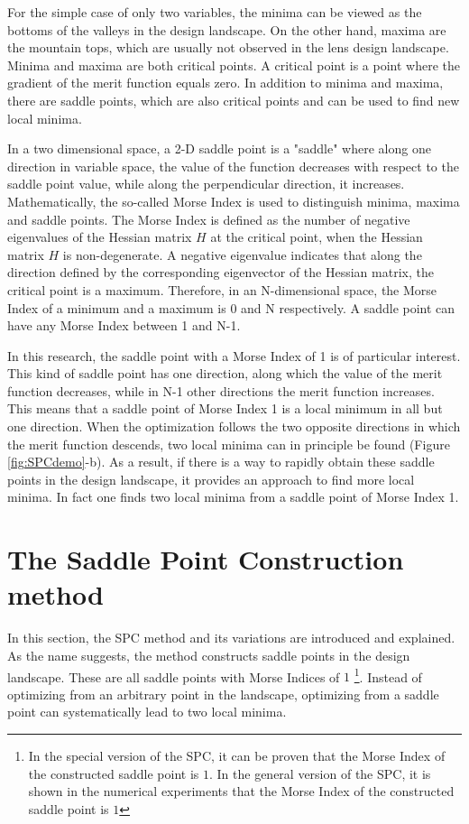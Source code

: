 For the simple case of only two variables, the minima can be viewed as the bottoms of the valleys in the design landscape. On the other hand, maxima are the mountain tops, which are usually not observed in the lens design landscape. Minima and maxima are both critical points. A critical point is a point where the gradient of the merit function equals zero. In addition to minima and maxima, there are saddle points, which are also critical points and can be used to find new local minima.

In a two dimensional space, a 2-D saddle point is a "saddle" where along one direction in variable space, the value of the function decreases with respect to the saddle point value, while along the perpendicular direction, it increases. Mathematically, the so-called Morse Index is used to distinguish minima, maxima and saddle points. The Morse Index is defined as the number of negative eigenvalues of the Hessian matrix \textbf{$H$} at the critical point, when the Hessian matrix \textbf{$H$} is non-degenerate. A negative eigenvalue indicates that along the direction defined by the corresponding eigenvector of the Hessian matrix, the critical point is a maximum. Therefore, in an N-dimensional space, the Morse Index of a minimum and a maximum is 0 and N respectively. A saddle point can have any Morse Index between 1 and N-1. 

In this research, the saddle point with a Morse Index of 1 is of particular interest. This kind of saddle point has one direction, along which the value of the merit function decreases, while in N-1 other directions the merit function increases. This means that a saddle point of Morse Index 1 is a local minimum in all but one direction. When the optimization follows the two opposite directions in which the merit function descends, two local minima can in principle be found (Figure \ref{fig:SPCdemo}-b). As a result, if there is a way to rapidly obtain these saddle points in the design landscape, it provides an approach to find more local minima. In fact one finds two local minima from a saddle point of Morse Index 1. 

\section{The Saddle Point Construction method}
In this section, the SPC method and its variations are introduced and explained. As the name suggests, the method constructs saddle points in the design landscape. These are all saddle points with Morse Indices of $1$  \footnote{In the special version of the SPC, it can be proven that the Morse Index of the constructed saddle point is $1$. In the general version of the SPC, it is shown in the numerical experiments that the Morse Index of the constructed saddle point is $1$}. Instead of optimizing from an arbitrary point in the landscape, optimizing from a saddle point can systematically lead to two local minima. 

